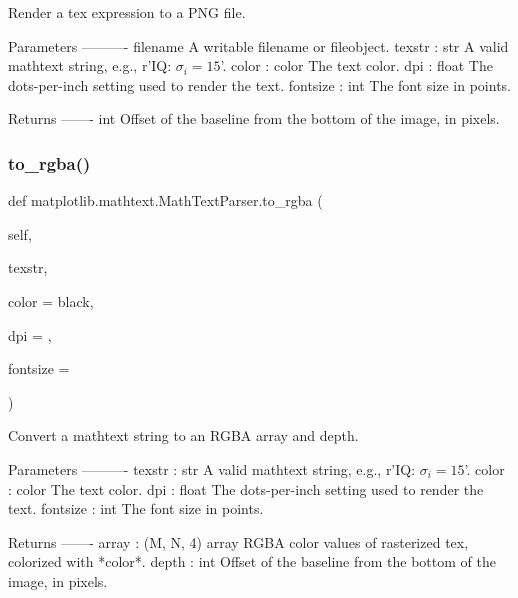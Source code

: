 \begin{DoxyVerb}Render a tex expression to a PNG file.

Parameters
----------
filename
    A writable filename or fileobject.
texstr : str
    A valid mathtext string, e.g., r'IQ: $\sigma_i=15$'.
color : color
    The text color.
dpi : float
    The dots-per-inch setting used to render the text.
fontsize : int
    The font size in points.

Returns
-------
int
    Offset of the baseline from the bottom of the image, in pixels.
\end{DoxyVerb}
 \mbox{\label{classmatplotlib_1_1mathtext_1_1MathTextParser_ab3fccc3a3709a88886947191ce71e0ec}} 
\subsubsection{\texorpdfstring{to\+\_\+rgba()}{to\_rgba()}}
{\footnotesize\ttfamily def matplotlib.\+mathtext.\+Math\+Text\+Parser.\+to\+\_\+rgba (\begin{DoxyParamCaption}\item[{}]{self,  }\item[{}]{texstr,  }\item[{}]{color = {\ttfamily \textquotesingle{}black\textquotesingle{}},  }\item[{}]{dpi = {},  }\item[{}]{fontsize = {} }\end{DoxyParamCaption})}

\begin{DoxyVerb}Convert a mathtext string to an RGBA array and depth.

Parameters
----------
texstr : str
    A valid mathtext string, e.g., r'IQ: $\sigma_i=15$'.
color : color
    The text color.
dpi : float
    The dots-per-inch setting used to render the text.
fontsize : int
    The font size in points.

Returns
-------
array : (M, N, 4) array
    RGBA color values of rasterized tex, colorized with *color*.
depth : int
    Offset of the baseline from the bottom of the image, in pixels.
\end{DoxyVerb}
 

